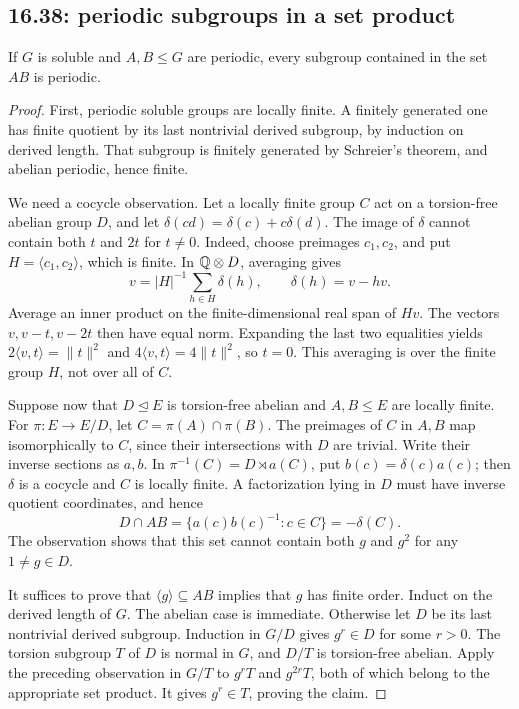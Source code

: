 \subsection{16.38: periodic subgroups in a set product}
\label{cand:16.38}
\begin{proposition}
If \(G\) is soluble and \(A,B\le G\) are periodic, every subgroup
contained in the set \(AB\) is periodic.
\end{proposition}
\begin{proof}
First, periodic soluble groups are locally finite. A finitely generated
one has finite quotient by its last nontrivial derived subgroup,
by induction on derived length. That subgroup is finitely generated
by Schreier's theorem, and abelian periodic, hence finite.

We need a cocycle observation. Let a locally finite group \(C\) act on
a torsion-free abelian group \(D\), and let
\(\delta(cd)=\delta(c)+c\delta(d)\).
The image of \(\delta\) cannot contain both \(t\) and \(2t\) for \(t\ne0\).
Indeed, choose preimages \(c_1,c_2\), and put \(H=\langle c_1,c_2\rangle\),
which is finite. In \(\mathbb Q\otimes D\), averaging gives
\[
 v=|H|^{-1}\sum_{h\in H}\delta(h),\qquad
 \delta(h)=v-hv.
\]
Average an inner product on the finite-dimensional real span of \(Hv\).
The vectors \(v,v-t,v-2t\) then have equal norm. Expanding the last two
equalities yields
\(2\langle v,t\rangle=\|t\|^2\) and
\(4\langle v,t\rangle=4\|t\|^2\), so \(t=0\).
This averaging is over the finite group \(H\), not over all of \(C\).

Suppose now that \(D\trianglelefteq E\) is torsion-free abelian and
\(A,B\le E\) are locally finite. For \(\pi:E\to E/D\), let
\(C=\pi(A)\cap\pi(B)\). The preimages of \(C\) in \(A,B\) map
isomorphically to \(C\), since their intersections with \(D\) are trivial.
Write their inverse sections as \(a,b\). In
\(\pi^{-1}(C)=D\rtimes a(C)\), put \(b(c)=\delta(c)a(c)\);
then \(\delta\) is a cocycle and \(C\) is locally finite.
A factorization lying in \(D\) must have inverse quotient coordinates,
and hence
\[
 D\cap AB=\{a(c)b(c)^{-1}:c\in C\}=-\delta(C).
\]
The observation shows that this set cannot contain both \(g\) and
\(g^2\) for any \(1\ne g\in D\).

It suffices to prove that \(\langle g\rangle\subseteq AB\) implies
that \(g\) has finite order. Induct on the derived length of \(G\).
The abelian case is immediate. Otherwise let \(D\) be its last
nontrivial derived subgroup. Induction in \(G/D\) gives \(g^r\in D\)
for some \(r>0\). The torsion subgroup \(T\) of \(D\) is normal in \(G\),
and \(D/T\) is torsion-free abelian. Apply the preceding observation
in \(G/T\) to \(g^rT\) and \(g^{2r}T\), both of which belong to the
appropriate set product. It gives \(g^r\in T\), proving the claim.
\end{proof}

